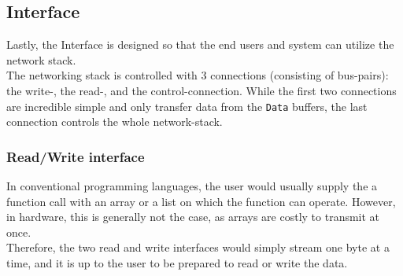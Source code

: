 \subsection{Interface}
Lastly, the Interface is designed so that the end users and system can utilize
the network stack.\\
The networking stack is controlled with 3 connections (consisting of bus-pairs):
the write-, the read-, and the control-connection. While the first two connections
are incredible simple and only transfer data from the \texttt{Data} buffers,
the last connection controls the whole network-stack.

\subsubsection{Read/Write interface}
In conventional programming languages, the user would usually supply the a
function call with an array or a list on which the function can operate.
However, in hardware, this is generally not the case, as arrays are costly to
transmit at once.\\
Therefore, the two read and write interfaces would simply stream one byte at a
time, and it is up to the user to be prepared to read or write the data.



